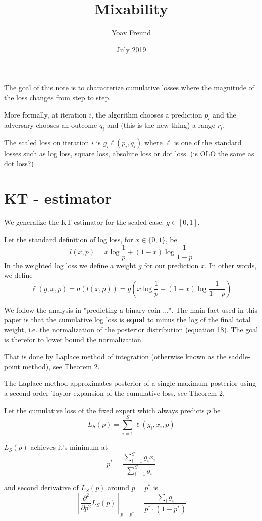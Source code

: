\documentclass{article}
\title{Mixability}
\author{Yoav Freund}
\date{July 2019}
\begin{document}
\maketitle

The goal of this note is to characterize cumulative losses where the magnitude of the loss changes from step to step.

More formally, at iteration $i$, the algorithm chooses a prediction $p_i$ and the adversary chooses an outcome $q_i$ and (this is the new thing) a range $r_i$.

The scaled loss on iteration $i$  is $g_i \ell(p_i,q_i)$ where $\ell$ is one of the standard losses such as log loss, square loss, absolute loss or dot loss. (is OLO the same as dot loss?)


\section{KT - estimator}
We generalize the KT estimator for the scaled case: $g \in [0,1]$.

Let the standard definition of log loss, for $x \in \{0,1\}$, be 
\[
l(x,p) = x \log \frac{1}{p} + (1-x) \log \frac{1}{1-p}
\]
In the weighted log loss we define a weight $g$ for our prediction $x$. In other words, we define 
\[
\ell(g,x,p) = a(l(x,p)) = g \left( x \log \frac{1}{p} + (1-x) \log \frac{1}{1-p} \right)
\]

We follow the analysis in "predicting a binary coin ...". The main fact used in this paper is that the cumulative log loss is {\bf equal} to minus the log of the final total weight, i.e. the normalization of the posterior distribution
(equation 18). The goal is therefor to lower bound the normalization.

That is done by Laplace method of integration (otherwise known as the saddle-point method), see Theorem 2.

The Laplace method approximates posterior of a single-maximum posterior using a  second order Taylor expansion of the cumulative loss, see Theorem 2.

Let the cumulative loss of the fixed expert which always predicts $p$ be 
\[
L_S(p) =  \sum_{i=1}^S \ell(g_i,x_i,p)
\]

$L_S(p)$ achieves it's minimum at 
\[
p^* = \frac{\sum_{i=1}^S g_i x_i}{\sum_{i=1}^S g_i}
\]

and second derivative of $L_S(p)$ around $p=p^*$ is
\[
\left[ \frac{\partial^2}{\partial p^2} L_S(p) \right]_{p=p^*} = \frac{\sum_i g_i}{p^* \cdot (1-p^*)}
\]
\end{document}
